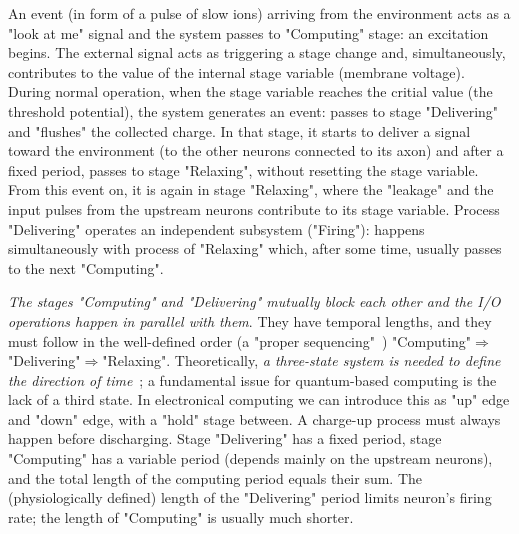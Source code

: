 An event (in form of a pulse of slow ions) arriving from the environment acts as a "look at me" signal
and the system passes to "Computing" stage: an excitation begins.
The external signal
acts as triggering a stage change and, simultaneously, contributes to the value of the internal stage variable (membrane voltage).
During normal operation, when the stage variable reaches the critial value (the threshold potential),
the system generates an event: passes to stage "Delivering" and "flushes" the collected charge.
In that stage, it starts to deliver a signal toward the environment
(to  the other neurons connected to its axon) and after a fixed period, passes to stage "Relaxing",
without resetting the stage variable. From this event on, it is again in stage
"Relaxing", where the "leakage" and the input pulses from the upstream neurons contribute to its
stage variable. Process "Delivering" operates an independent subsystem ("Firing"): happens simultaneously with 
process of "Relaxing" which, after some time, usually passes to the next "Computing".

\textit{The stages "Computing" and "Delivering" mutually block 
each other and the I/O operations happen in parallel with them}. They have temporal lengths, and they must follow in the well-defined order (a "proper sequencing"~\cite{EDVACreport1945,VeghRevisingClassicComputing:2021}) "Computing"$\Rightarrow$ "Delivering"$\Rightarrow$"Relaxing". Theoretically, \textit{a three-state system is needed to define the direction of time}~\cite{ThreeStateUnidirectional:2004}; a fundamental issue for quantum-based computing is the lack of a third state. In electronical computing we can introduce this as "up" edge and "down" edge, with a "hold" stage between.  A charge-up process must always happen before discharging. Stage "Delivering" has a fixed period, stage "Computing" has a variable period (depends mainly on the upstream neurons), and the total length of the computing period equals their sum. The (physiologically defined) length of the "Delivering" period limits neuron's firing rate; the length of "Computing" is usually much shorter.

\fi

\ifx\magyar\undefined


